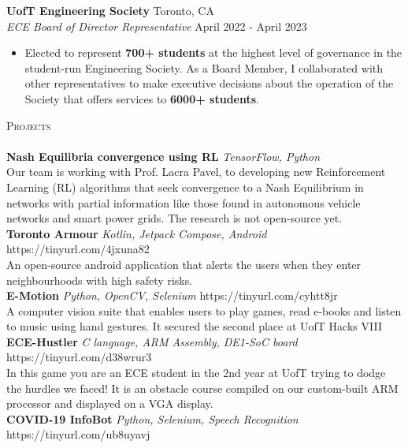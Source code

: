 \documentclass[a4paper]{article}
\newcommand{\lineunder} {
    \vspace*{-8pt} \\
    \hspace*{-18pt} \hrulefill \\
}
\newcommand{\header} [1] {
    {\hspace*{-18pt}\vspace*{6pt} \textsc{#1}}
    \vspace*{-6pt} \lineunder
}
\begin{document}
\textbf{UofT Engineering Society} \hfill Toronto, CA\\
\textit{ECE Board of Director Representative} \hfill April 2022 - April 2023\\
\vspace{-3pt}
\begin{itemize}
	\item Elected to represent \textbf{700+ students} at the highest level of governance in the student-run Engineering Society. As a Board Member, I collaborated with other representatives to make executive decisions about the operation of the Society that offers services to \textbf{6000+ students}.
\end{itemize}

\header{Projects}
{\textbf{Nash Equilibria convergence using RL}} {\sl TensorFlow, Python} \\
Our team is working with Prof. Lacra Pavel, to developing new Reinforcement Learning (RL) algorithms that seek convergence to a Nash Equilibrium in networks
 with partial information like those found in autonomous vehicle networks and smart power grids. The research is not open-source yet.\\
\vspace*{2mm}
{\textbf{Toronto Armour}} {\sl Kotlin, Jetpack Compose, Android} \hfill https://tinyurl.com/4jxuna82\\
An open-source android application that alerts the users when they enter neighbourhoods with high safety risks.\\
\vspace*{2mm}
{\textbf{E-Motion}} {\sl Python, OpenCV, Selenium} \hfill https://tinyurl.com/cyhtt8jr\\
A computer vision suite that enables users to play games, read e-books and listen to music using hand gestures. It secured the second place at UofT Hacks VIII\\
\vspace*{2mm}
{\textbf{ECE-Hustler}} {\sl C language, ARM Assembly, DE1-SoC board} \hfill https://tinyurl.com/d38wrur3\\
In this game you are an ECE student in the 2nd year at UofT trying to dodge the hurdles we faced! It is an obstacle course compiled on our custom-built ARM processor and displayed on a VGA display.\\
\vspace*{2mm}
{\textbf{COVID-19 InfoBot}} {\sl Python, Selenium, Speech Recognition} \hfill https://tinyurl.com/ub8uyavj\\
\end{document}
